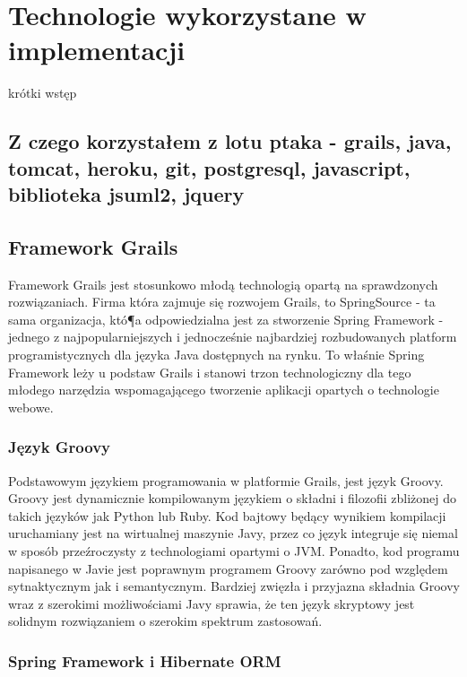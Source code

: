 \chapter{Technologie wykorzystane w implementacji}
  
  krótki wstęp

  \section{Z czego korzystałem z lotu ptaka - grails, java, tomcat, heroku, git, postgresql, javascript, biblioteka jsuml2, jquery}

  \section{Framework Grails}
    
    Framework Grails jest stosunkowo młodą technologią opartą na sprawdzonych rozwiązaniach. Firma która zajmuje się rozwojem Grails, to SpringSource - ta sama organizacja, któ¶a odpowiedzialna jest za stworzenie Spring Framework - jednego z najpopularniejszych i jednocześnie najbardziej rozbudowanych platform programistycznych dla języka Java dostępnych na rynku. To właśnie Spring Framework leży u podstaw Grails i stanowi trzon technologiczny dla tego młodego narzędzia wspomagającego tworzenie aplikacji opartych o technologie webowe.  

    \subsection{Język Groovy}

      Podstawowym językiem programowania w platformie Grails, jest język Groovy. Groovy jest dynamicznie kompilowanym językiem o składni i filozofii zbliżonej do takich języków jak Python lub Ruby. Kod bajtowy będący wynikiem kompilacji uruchamiany jest na wirtualnej maszynie Javy, przez co język integruje się niemal w sposób przeźroczysty z technologiami opartymi o JVM. Ponadto, kod programu napisanego w Javie jest poprawnym programem Groovy zarówno pod względem sytnaktycznym jak i semantycznym. Bardziej zwięzła i przyjazna składnia Groovy wraz z szerokimi możliwościami Javy sprawia, że ten język skryptowy jest solidnym rozwiązaniem o szerokim spektrum zastosowań.

    \subsection{Spring Framework i Hibernate ORM}

